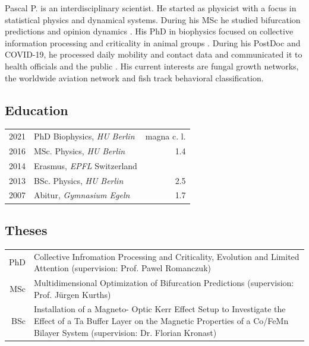 \documentclass[10pt,twocolumn]{article}
\begin{document}
\vspace{2em}

\begin{sansserif}
Pascal P.  is an interdisciplinary scientist.
He started as physicist with a focus in statistical physics and dynamical systems.
During his MSc he studied bifurcation predictions and opinion dynamics \cite{klamser_zealotry_2017}.
His PhD in biophysics focused on collective information processing and criticality
in animal groups \cite{klamser_collective_2021, klamser_impact_2021, lukas_acoustic_2021, lukas_diurnal_2021, sbragaglia_evolutionary_2022, doran_fish_2022, gomez-nava_fish_2023}.
During his PostDoc and COVID-19, he processed daily mobility and contact data and
communicated it to health officials and the public \cite{maier_germanys_2022, maier_estimating_2023}. 
His current interests are fungal growth networks,
the worldwide aviation network\cite{klamser_enhancing_2023, klamser_inferring_2024} and fish track behavioral classification.


\end{sansserif}



\subsection{Education}
\begin{tabular}{r|l r}
    2021 & PhD Biophysics, \textit{HU Berlin} &magna c. l.\\
    2016 & MSc. Physics, \textit{HU Berlin} &1.4\\
    2014 & Erasmus, \textit{EPFL} Switzerland & \\
    2013 & BSc. Physics, \textit{HU Berlin} &2.5\\
    2007 & Abitur, \textit{Gymnasium Egeln} &1.7 
\end{tabular}


\subsection{Theses}
{\renewcommand{\arraystretch}{1.4}
\begin{tabular}{r|p{}}
    PhD &  Collective Infromation Processing and Criticality, Evolution and Limited Attention {\footnotesize (supervision: Prof. Pawel Romanczuk)}\\
    MSc &  Multidimensional Optimization of Bifurcation Predictions {\footnotesize (supervision: Prof. Jürgen Kurths)}\\
    BSc &  {\footnotesize Installation of a Magneto- Optic Kerr Effect Setup to Investigate the Effect of a Ta Buffer Layer on the Magnetic Properties of a Co/FeMn Bilayer System (supervision: Dr. Florian Kronast)}
\end{tabular}
}
\end{document}

